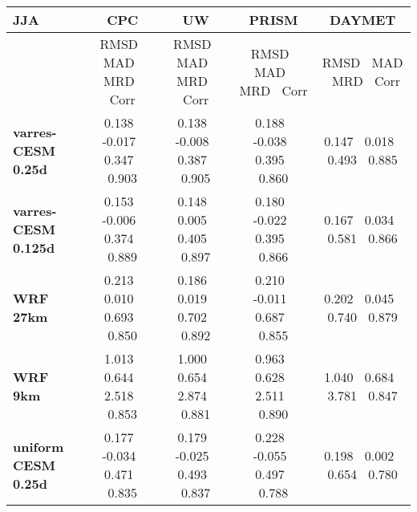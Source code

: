 \begin{table}
\begin{center}
\begin{tabular}{lcccc}
\hline \textbf{JJA} & \textbf{CPC}  & \textbf{UW} & \textbf{PRISM} & \textbf{DAYMET} \\
\hline $    $ & RMSD $\ $ MAD $\ $ MRD $\ $ Corr & RMSD $\ $ MAD $\ $ MRD $\ $ Corr & RMSD $\ $ MAD $\ $ MRD $\ $ Corr & RMSD $\ $ MAD $\ $ MRD $\ $ Corr \\
\hline \textbf{varres-CESM 0.25d} & 0.138 $\ $ -0.017 $\ $ 0.347 $\ $ 0.903 & 0.138 $\ $ -0.008 $\ $ 0.387 $\ $ 0.905 & 0.188 $\ $ -0.038 $\ $ 0.395 $\ $ 0.860 & 0.147 $\ $ 0.018 $\ $ 0.493 $\ $ 0.885 \\
\textbf{varres-CESM 0.125d} & 0.153 $\ $ -0.006 $\ $ 0.374 $\ $ 0.889 & 0.148 $\ $ 0.005 $\ $ 0.405 $\ $ 0.897 & 0.180 $\ $ -0.022 $\ $ 0.395 $\ $ 0.866 & 0.167 $\ $ 0.034 $\ $ 0.581 $\ $ 0.866 \\
\textbf{WRF 27km} & 0.213 $\ $ 0.010 $\ $ 0.693 $\ $ 0.850 & 0.186 $\ $ 0.019 $\ $ 0.702 $\ $ 0.892 & 0.210 $\ $ -0.011 $\ $ 0.687 $\ $ 0.855 & 0.202 $\ $ 0.045 $\ $ 0.740 $\ $ 0.879 \\
\textbf{WRF 9km} & 1.013 $\ $ 0.644 $\ $ 2.518 $\ $ 0.853 & 1.000 $\ $ 0.654 $\ $ 2.874 $\ $ 0.881 & 0.963 $\ $ 0.628 $\ $ 2.511 $\ $ 0.890 & 1.040 $\ $ 0.684 $\ $ 3.781 $\ $ 0.847 \\
\textbf{uniform CESM 0.25d} & 0.177 $\ $ -0.034 $\ $ 0.471 $\ $ 0.835 & 0.179 $\ $ -0.025 $\ $ 0.493 $\ $ 0.837 & 0.228 $\ $ -0.055 $\ $ 0.497 $\ $ 0.788 & 0.198 $\ $ 0.002 $\ $ 0.654 $\ $ 0.780 \\
\hline
\end{tabular}


\end{center}
\end{table}
